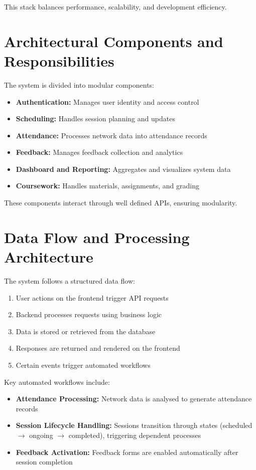This stack balances performance, scalability, and development efficiency.

\section{Architectural Components and Responsibilities}

The system is divided into modular components:

\begin{itemize}
    \item \textbf{Authentication:} Manages user identity and access control
    \item \textbf{Scheduling:} Handles session planning and updates
    \item \textbf{Attendance:} Processes network data into attendance records
    \item \textbf{Feedback:} Manages feedback collection and analytics
    \item \textbf{Dashboard and Reporting:} Aggregates and visualizes system data
    \item \textbf{Coursework:} Handles materials, assignments, and grading
\end{itemize}

These components interact through well defined APIs, ensuring modularity.

\section{Data Flow and Processing Architecture}

The system follows a structured data flow:

\begin{enumerate}
    \item User actions on the frontend trigger API requests
    \item Backend processes requests using business logic
    \item Data is stored or retrieved from the database
    \item Responses are returned and rendered on the frontend
    \item Certain events trigger automated workflows
\end{enumerate}

Key automated workflows include:

\begin{itemize}
    \item \textbf{Attendance Processing:} Network data is analysed to generate attendance records
    \item \textbf{Session Lifecycle Handling:} Sessions transition through states (scheduled $\rightarrow$ ongoing
    $\rightarrow$ completed), triggering dependent processes
    \item \textbf{Feedback Activation:} Feedback forms are enabled automatically after session
    completion
\end{itemize}

